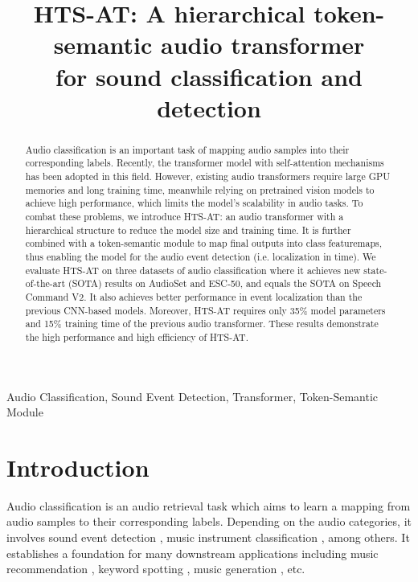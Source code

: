 \documentclass{article}
\title{HTS-AT: A hierarchical token-semantic audio transformer \\ for sound classification and detection }
\begin{document}
\maketitle


\begin{abstract}
Audio classification is an important task of mapping audio samples into their corresponding labels. 
Recently, the transformer model with self-attention mechanisms has been adopted in this field. 
However, existing audio transformers require large GPU memories and long training time, meanwhile relying on pretrained vision models to achieve high performance, which limits the model's scalability in audio tasks. 
To combat these problems, we introduce HTS-AT: an audio transformer with a hierarchical structure to reduce the model size and training time. It is further combined with a token-semantic module to map final outputs into class featuremaps, thus enabling the model for the audio event detection (i.e. localization in time). 
We evaluate HTS-AT on three datasets of audio classification where it achieves new state-of-the-art (SOTA) results on AudioSet and ESC-50, and equals the SOTA on Speech Command V2. It also achieves better performance in event localization than the previous CNN-based models. 
Moreover, HTS-AT requires only 35\% model parameters and 15\% training time of the previous audio transformer. These results demonstrate the high performance and high efficiency of HTS-AT.

\end{abstract}
\begin{keywords}
Audio Classification, Sound Event Detection, Transformer, Token-Semantic Module
\end{keywords}


\section{Introduction}
\vspace{-0.2cm}
Audio classification is an audio retrieval task which aims to learn a mapping from audio samples to their corresponding labels. Depending on the audio categories, it involves sound event detection \cite{sed-tutor}, music instrument classification \cite{cmg-ac}, among others. It establishes a foundation for many downstream applications including music recommendation \cite{ke-recom}, keyword spotting \cite{speechcommandsv2}, music generation \cite{ke-sketchnet, haowen-muspy}, etc.
\end{document}
